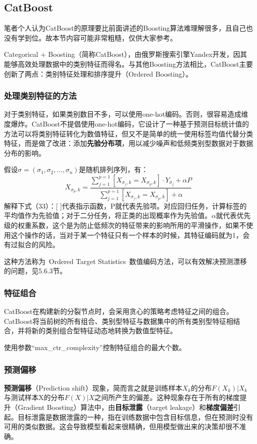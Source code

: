 \subsection{CatBoost}
笔者个人认为CatBoost的原理要比前面讲述的Boosting算法难理解很多，且自己也没有学到位。故本节内容可能非常粗糙，仅供大家参考。

Categorical + Boosting（简称CatBoost），由俄罗斯搜索引擎Yandex开发，因其能够高效处理数据中的类别特征而得名。与其他Boosting方法相比，CatBoost主要创新了两点：类别特征处理和排序提升（Ordered Boosting）。

\subsubsection{处理类别特征的方法}
对于类别特征，如果类别数目不多，可以使用one-hot编码。否则，很容易造成维度爆炸。CatBoost不提倡使用one-hot编码，它设计了一种基于预测目标统计值的方法可以将类别特征转化为数值特征，但又不是简单的统一使用标签均值代替分类特征，而是做了改进：添加\textbf{先验分布项}，用以减少噪声和低频类别型数据对于数据分布的影响。

假设$\sigma=(\sigma_{1},\sigma_{2},...,\sigma_{n})$是随机排列序列，有：
\begin{equation}X_{\sigma_p,k}=\frac{\sum_{j=1}^{p=1}[X_{\sigma_j,k}=X_{\sigma_p,k}]\cdot Y_{\sigma_j}+\alpha P}{\sum_{j=1}^{p=1}[X_{\sigma_j,k}=X_{\sigma_p,k}]+\alpha}\end{equation}
解释下式（33）：[ ]代表指示函数，P就代表先验项。对应回归任务，计算标签的平均值作为先验值；对于二分任务，将正类的出现概率作为先验值。$\alpha$就代表优先级的权重系数，这个是为防止低频次的特征带来的影响所用的平滑操作，如果不使用这个操作的话，当对于某一个特征只有一个样本的时候，其特征编码就为1，会有过拟合的风险。

这种方法称为 Ordered Target Statistics 数值编码方法，可以有效解决预测漂移的问题，见5.6.3节。

\subsubsection{特征组合}
CatBoost在构建新的分裂节点时，会采用贪心的策略考虑特征之间的组合。CatBoost将当前树的所有组合、类别型特征与数据集中的所有类别型特征相结合，并将新的类别组合型特征动态地转换为数值型特征。

使用参数“max\_ctr\_complexity”控制特征组合的最大个数。

\subsubsection{预测偏移}
\textbf{预测偏移}（Prediction shift）现象，简而言之就是训练样本$X_{k}$的分布$F(X_k)|X_k$与测试样本X的分布$F(X)|X$之间所产生的偏差。这种现象存在于所有的梯度提升（Gradient Boosting）算法中，由\textbf{目标泄露}（target leakage）和\textbf{梯度偏差}引起。目标泄露是数据泄露的一种，指在训练数据中包含目标信息，但在预测时没有可用的类似数据。这会导致模型看起来很精确，但用模型做出来的决策却很不准确。

